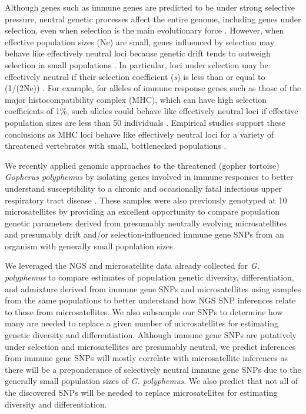 \documentclass[english]{article}\usepackage[]{graphicx}\usepackage[]{color}
\begin{document}
Although genes such as immune genes are predicted to be under strong selective pressure, neutral genetic processes affect the entire genome, including genes under selection, even when selection is the main evolutionary force \citep{Kuo_et_al_2009, Lynch_et_al_2011}. However, when effective population sizes (Ne) are small, genes influenced by selection may behave like effectively neutral loci because genetic drift tends to outweigh selection in small populations \citep[e.g.,][]{Grueber_et_al_2013, Miller_and_Lambert_2004}. In particular, loci under selection may be effectively neutral if their selection coefficient (\textit{s}) is less than or equal to (1/(2Ne)) \citep{Wright_1931}. For example, for alleles of immune response genes such as those of the major histocompatibility complex (MHC), which can have high selection coefficients of 1\%, such alleles could behave like effectively neutral loci if effective population sizes are less than 50 individuals \citep{Frankham_et_al_2010}. Empirical studies support these conclusions as MHC loci behave like effectively neutral loci for a variety of threatened vertebrates with small, bottlenecked populations \citep{Weber_et_al_2004, Miller_et_al_2008, Taylor_et_al_2012}.

We recently applied genomic approaches to the threatened (gopher tortoise) \textit{Gopherus polyphemus} by isolating genes involved in immune responses to better understand susceptibility to a chronic and occasionally fatal infectious upper respiratory tract disease \citep{Elbers_and_Taylor_2015}. These samples were also previously genotyped at 10 microsatellites by \citet{Clostio_et_al_2012} providing an excellent opportunity to compare population genetic parameters derived from presumably neutrally evolving microsatellites and presumably drift and/or selection-influenced immune gene SNPs from an organism with generally small population sizes.

We leveraged the NGS \citep{Elbers_and_Taylor_2015} and microsatellite \citep{Clostio_et_al_2012} data already collected for \textit{G. polyphemus} to compare estimates of population genetic diversity, differentiation, and admixture derived from immune gene SNPs and microsatellites using samples from the same populations to better understand how NGS SNP inferences relate to those from microsatellites. We also subsample our SNPs to determine how many are needed to replace a given number of microsatellites for estimating genetic diversity and differentiation. Although immune gene SNPs are putatively under selection and microsatellites are presumably neutral, we predict inferences from immune gene SNPs will mostly correlate with microsatellite inferences as there will be a preponderance of selectively neutral immune gene SNPs due to the generally small population sizes of \textit{G. polyphemus}. We also predict that not all of the discovered SNPs will be needed to replace microsatellites for estimating diversity and differentiation.
\end{document}
